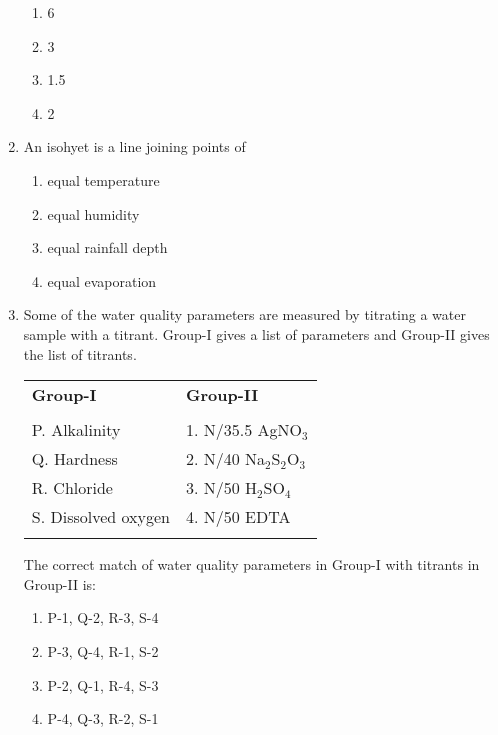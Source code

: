 \documentclass[journal,12pt,onecolumn]{IEEEtran}
\theoremstyle{remark}
\begin{document}
\begin{enumerate}
    \begin{multicols}{4}
    \begin{enumerate}
        \item 6
        \item 3
        \item 1.5
        \item 2
    \end{enumerate}
    \end{multicols}

    \item An isohyet is a line joining points of
    
    \begin{multicols}{2}
    \begin{enumerate}
        \item equal temperature
        \item equal humidity
        \item equal rainfall depth
        \item equal evaporation
    \end{enumerate}
    \end{multicols}

    \item Some of the water quality parameters are measured by titrating a water sample with a titrant. Group-I gives a list of parameters and Group-II gives the list of titrants.
    
    \begin{center}
    \begin{tabular}{ p{4cm} p{4cm}}
       
        \textbf{Group-I} & \textbf{Group-II} \\
       \\
        P. Alkalinity & 1. N/35.5 AgNO$_3$ \\
        Q. Hardness & 2. N/40 Na$_2$S$_2$O$_3$ \\
        R. Chloride & 3. N/50 H$_2$SO$_4$ \\
        S. Dissolved oxygen & 4. N/50 EDTA \\\\
       
    \end{tabular}
    \end{center}

    The correct match of water quality parameters in Group-I with titrants in Group-II is:
    
    \begin{multicols}{2}
    \begin{enumerate}
        \item P-1, Q-2, R-3, S-4
        \item P-3, Q-4, R-1, S-2
        \item P-2, Q-1, R-4, S-3
        \item P-4, Q-3, R-2, S-1
    \end{enumerate}
    \end{multicols}


\end{enumerate}
\end{document}
